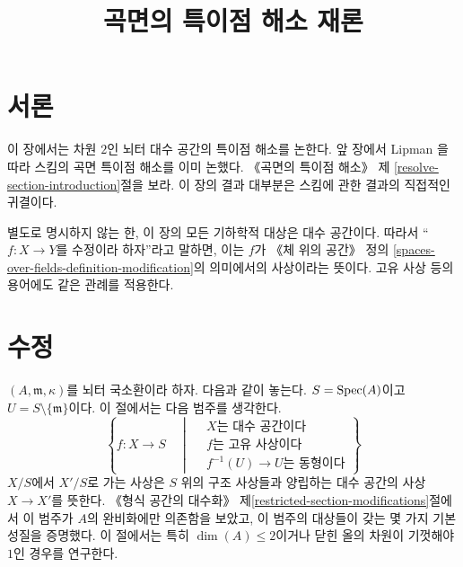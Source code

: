 

%


\title{곡면의 특이점 해소 재론}


\maketitle

\label{section-phantom}

\tableofcontents

\section{서론}
\label{section-introduction}

\noindent
이 장에서는 차원 $2$인 뇌터 대수 공간의 특이점 해소를 논한다.
앞 장에서 Lipman \cite{Lipman}을 따라 스킴의 곡면 특이점 해소를
이미 논했다. 《곡면의 특이점 해소》 제
\ref{resolve-section-introduction}절을 보라.
이 장의 결과 대부분은 스킴에 관한 결과의 직접적인 귀결이다.

\medskip\noindent
별도로 명시하지 않는 한, 이 장의 모든 기하학적 대상은 대수 공간이다.
따라서 ``$f : X \to Y$를 수정이라 하자''라고 말하면, 이는
$f$가 《체 위의 공간》 정의
\ref{spaces-over-fields-definition-modification}의 의미에서의 사상이라는 뜻이다.
고유 사상 등의 용어에도 같은 관례를 적용한다.














\section{수정}
\label{section-modifications}

\noindent
$(A, \mathfrak m, \kappa)$를 뇌터 국소환이라 하자. 다음과 같이 놓는다.
$S = \mathop{\mathrm{Spec}}(A)$이고 $U = S \setminus \{\mathfrak m\}$이다. 이 절에서는
다음 범주를 생각한다.
\begin{equation}
\label{equation-modification}
\left\{
f : X \longrightarrow S
\quad \middle| \quad
\begin{matrix}
X\text{는 대수 공간이다}\\
f\text{는 고유 사상이다}\\
f^{-1}(U) \to U\text{는 동형이다}
\end{matrix}
\right\}
\end{equation}
$X/S$에서 $X'/S$로 가는 사상은 $S$ 위의 구조 사상들과 양립하는
대수 공간의 사상 $X \to X'$를 뜻한다. 《형식 공간의 대수화》
제\ref{restricted-section-modifications}절에서 이 범주가 $A$의 완비화에만
의존함을 보았고, 이 범주의 대상들이 갖는 몇 가지 기본 성질을 증명했다.
이 절에서는 특히 $\dim(A) \leq 2$이거나 닫힌 올의 차원이
기껏해야 $1$인 경우를 연구한다.

